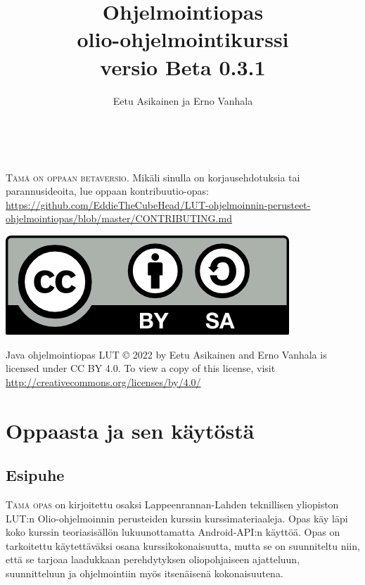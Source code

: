 \documentclass[openany]{book}
\title{Ohjelmointiopas \\ \small{\lutin olio-ohjelmointikurssi} \\ \small{versio Beta 0.3.1}}
\newcommand{\newthought}[1]{\smallskip\textsc{#1}}
\newcommand{\lutin}{Lappeenrannan-Lahden teknillisen yliopiston LUT:n }
\begin{document}
\author{Eetu Asikainen ja Erno Vanhala}

\frontmatter

\maketitle

\newpage
~\vfill
\thispagestyle{empty}
\setlength{\parindent}{0pt}
\setlength{\parskip}{\baselineskip}

\textsc{Tämä on oppaan betaversio.} Mikäli sinulla on korjausehdotuksia tai parannusideoita, lue
oppaan kontribuutio-opas: \url{https://github.com/EddieTheCubeHead/LUT-ohjelmoinnin-perusteet-ohjelmointiopas/blob/master/CONTRIBUTING.md}

\includegraphics[scale=1]{cc-by-sa}

Java ohjelmointiopas LUT © 2022 by Eetu Asikainen and Erno Vanhala is licensed under CC BY 4.0. To view a copy of this license, visit \url{http://creativecommons.org/licenses/by/4.0/}

\tableofcontents
\listoflistings
\listoffigures
\listoftables


\chapter{Oppaasta ja sen käytöstä}
\label{oppaasta}


\section{Esipuhe}
\label{esipuhe}

\newthought{Tämä opas} on kirjoitettu osaksi \lutin Olio-ohjelmoinnin perusteiden kurssin
kurssimateriaaleja. Opas käy läpi koko kurssin  teoriasisällön lukuunottamatta Android-API:n
käyttöä. Opas on tarkoitettu käytettäväksi osana kurssikokonaisuutta, mutta se on suunniteltu
niin, että se tarjoaa laadukkaan perehdytyksen oliopohjaiseen ajatteluun, suunnitteluun ja
ohjelmointiin myös itsenäisenä kokonaisuutena.
\end{document}
